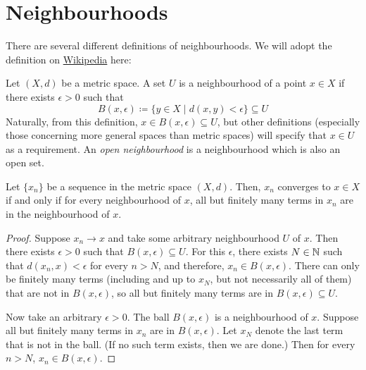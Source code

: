 
\section{Neighbourhoods}
There are several different definitions of neighbourhoods. We will adopt the definition on \href{https://en.wikipedia.org/wiki/Neighbourhood_(mathematics)#In_a_metric_space}{Wikipedia} here:
\begin{definition}[Neighbourhood]
  Let $(X, d)$ be a metric space. A set $U$ is a neighbourhood of a point $x \in X$ if there exists $\epsilon > 0$ such that 
  \[
    B(x, \epsilon) \coloneqq \{y \in X \; | \; d(x, y) < \epsilon \} \subseteq U
  \]
  Naturally, from this definition, $x \in B(x, \epsilon) \subseteq U$, but other definitions (especially those concerning more general spaces than metric spaces) will specify that $x \in U$ as a requirement. An \textit{open neighbourhood} is a neighbourhood which is also an open set.
\end{definition}
\begin{prop}
  Let $\{x_n\}$ be a sequence in the metric space $(X, d)$. Then, $x_n$ converges to $x \in X$ if and only if for every neighbourhood of $x$, all but finitely many terms in $x_n$ are in the neighbourhood of $x$.
\end{prop}
\begin{proof}
  Suppose $x_n \to x$ and take some arbitrary neighbourhood $U$ of $x$. Then there exists $\epsilon > 0$ such that $B(x, \epsilon) \subseteq U$. For this $\epsilon$, there exists $N \in \mathbb{N}$ such that $d(x_n, x) < \epsilon$ for every $n > N$, and therefore, $x_n \in B(x, \epsilon)$. There can only be finitely many terms (including and up to $x_N$, but not necessarily all of them) that are not in $B(x, \epsilon)$, so all but finitely many terms are in $B(x, \epsilon) \subseteq U$.

  Now take an arbitrary $\epsilon > 0$. The ball $B(x, \epsilon)$ is a neighbourhood of $x$. Suppose all but finitely many terms in $x_n$ are in $B(x, \epsilon)$. Let $x_N$ denote the last term that is not in the ball. (If no such term exists, then we are done.) Then for every $n > N$, $x_n \in B(x, \epsilon)$.
\end{proof}


